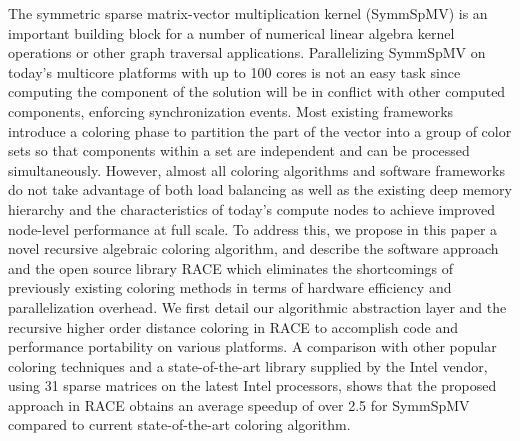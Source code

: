 
The symmetric sparse matrix-vector multiplication kernel (\acrshort{SymmSpMV}) is an important building block for a number
of numerical linear algebra kernel operations or other graph traversal applications. Parallelizing \acrshort{SymmSpMV} on today’s multicore platforms with up to 100  cores
is not an easy task since computing the component of the solution will be in conflict with other computed 
components, enforcing synchronization events.  Most existing frameworks introduce a coloring phase to partition 
the part of the vector into a group of color sets so that components within a set are 
independent  and can be processed simultaneously. However, almost all coloring algorithms and software frameworks do not take 
advantage of both load balancing as well as the existing deep memory hierarchy  and the characteristics of today's compute nodes 
to achieve improved node-level performance at full scale.  To address this, we propose in this paper a novel recursive algebraic coloring algorithm, 
and describe the software approach and the open source library \acrfull{RACE} which eliminates the shortcomings of previously 
existing coloring methods in terms of hardware efficiency  and parallelization overhead. We first detail our algorithmic abstraction layer and 
the recursive higher order distance coloring in \acrshort{RACE} to accomplish 
code and performance portability on various platforms.  A comparison with other popular coloring techniques and a state-of-the-art library 
supplied by the Intel vendor, using 31 sparse matrices on the latest Intel  processors, shows that the proposed approach in \acrshort{RACE}
obtains an average speedup of over 2.5 for \acrshort{SymmSpMV} compared to current state-of-the-art coloring algorithm.

